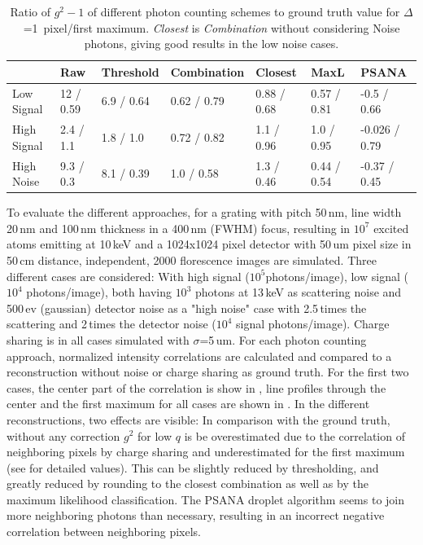 \begin{table}
	\caption[Ratio of $g^2-1$ of different photon counting schemes to ground truth value]{Ratio of $g^2-1$ of different photon counting schemes to ground truth value  for $\Delta$=1\, pixel/first maximum. \textit{Closest} is \textit{Combination} without considering Noise photons, giving good results in the low noise cases.}
	\label{tab:photonrecon}
	
	\begin{adjustwidth}{-1em}{-2em}	
		\small
		\begin{tabular}{lllllll}
			\toprule
			&        Raw &       Threshold &         Combination &      Closest &         MaxL &          PSANA \\
			\midrule
			Low Signal  &  12 / 0.59 &  6.9 / 0.64 &  0.62 / 0.79 &  0.88 / 0.68 &  0.57 / 0.81 &    -0.5 / 0.66 \\
			High Signal &  2.4 / 1.1 &   1.8 / 1.0 &  0.72 / 0.82 &   1.1 / 0.96 &   1.0 / 0.95 &  -0.026 / 0.79 \\
			High Noise  &  9.3 / 0.3 &  8.1 / 0.39 &   1.0 / 0.58 &   1.3 / 0.46 &  0.44 / 0.54 &   -0.37 / 0.45 \\
			\bottomrule
		\end{tabular}
	\end{adjustwidth}
\end{table}

To evaluate the different approaches, for a grating with pitch 50\,nm, line width 20\,nm and 100\,nm thickness in a 400\,nm (FWHM) focus, resulting in $10^7$ excited atoms emitting at 10\,keV and a 1024x1024 pixel detector with 50\,um pixel size in 50\,cm distance, independent, 2000 florescence images are simulated. Three different cases are considered: With high signal ($10^5 $photons/image), low signal ($10^4$ photons/image), both having $10^3$ photons at 13\,keV as scattering noise and 500\,ev (gaussian) detector noise as a "high noise" case  with 2.5\,times the scattering and 2\,times the detector noise  ($10^4$ signal photons/image). Charge sharing is in all cases simulated with $\sigma$=5\,um.  For each photon counting approach, normalized intensity correlations are calculated and compared to a reconstruction without noise or charge sharing as ground truth. For the first two cases, the center part of the correlation is show in , line profiles through the center and the first maximum for all cases are shown in . In the different reconstructions, two effects are visible: In comparison with the ground truth, without any correction $g^2$ for low $q$ is be overestimated due to the correlation of neighboring pixels by charge sharing and underestimated for the first maximum (see  for detailed values). This can be slightly reduced by thresholding, and greatly reduced by rounding to the closest combination as well as by the maximum likelihood classification. The PSANA droplet algorithm seems to join more neighboring photons than necessary, resulting in an incorrect negative correlation between neighboring pixels.  

